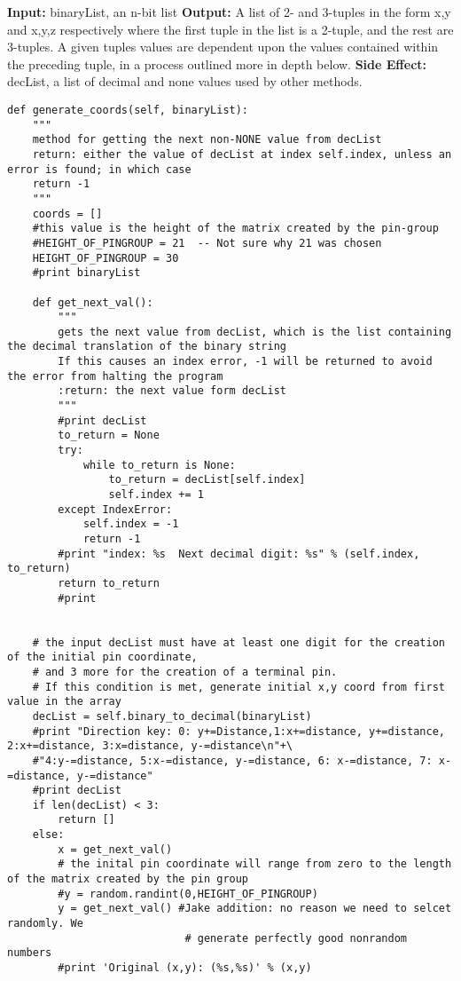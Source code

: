 \documentclass[a4paper]{article}
\begin{document}
\begin{enumerate}
\textbf{Input:} binaryList, an n-bit list
\textbf{Output:} A list of 2- and 3-tuples in the form x,y and x,y,z respectively where the first tuple in the list is a 2-tuple, and the rest are 3-tuples. A given tuples values are dependent upon the values contained within the preceding tuple, in a process outlined more in depth below.
\textbf{Side Effect:} decList, a list of decimal and none values used by other methods.

\begin{verbatim}
def generate_coords(self, binaryList):
    """
    method for getting the next non-NONE value from decList
    return: either the value of decList at index self.index, unless an error is found; in which case
    return -1
    """
    coords = []
    #this value is the height of the matrix created by the pin-group
    #HEIGHT_OF_PINGROUP = 21  -- Not sure why 21 was chosen
    HEIGHT_OF_PINGROUP = 30
    #print binaryList

    def get_next_val():
        """
        gets the next value from decList, which is the list containing the decimal translation of the binary string
        If this causes an index error, -1 will be returned to avoid the error from halting the program
        :return: the next value form decList
        """
        #print decList
        to_return = None
        try:
            while to_return is None:
                to_return = decList[self.index]
                self.index += 1
        except IndexError:
            self.index = -1
            return -1
        #print "index: %s  Next decimal digit: %s" % (self.index, to_return) 
        return to_return
        #print


    # the input decList must have at least one digit for the creation of the initial pin coordinate,
    # and 3 more for the creation of a terminal pin.
    # If this condition is met, generate initial x,y coord from first value in the array
    decList = self.binary_to_decimal(binaryList)
    #print "Direction key: 0: y+=Distance,1:x+=distance, y+=distance, 2:x+=distance, 3:x=distance, y-=distance\n"+\
    #"4:y-=distance, 5:x-=distance, y-=distance, 6: x-=distance, 7: x-=distance, y-=distance"
    #print decList
    if len(decList) < 3:
        return []
    else:
        x = get_next_val()
        # the inital pin coordinate will range from zero to the length of the matrix created by the pin group
        #y = random.randint(0,HEIGHT_OF_PINGROUP)
        y = get_next_val() #Jake addition: no reason we need to selcet randomly. We 
                            # generate perfectly good nonrandom numbers
        #print 'Original (x,y): (%s,%s)' % (x,y)


\end{verbatim}
\end{enumerate}
\end{document}
